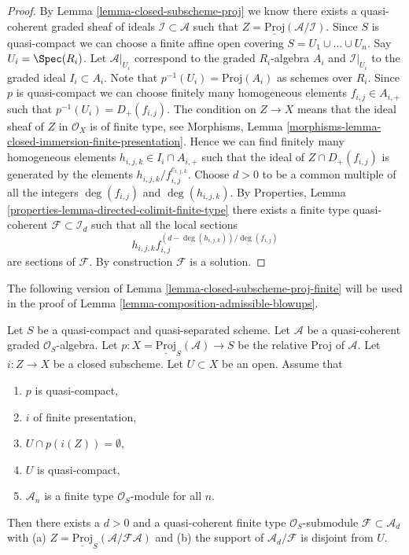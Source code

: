 \begin{proof}
By Lemma \ref{lemma-closed-subscheme-proj} we know there exists a
quasi-coherent graded sheaf of ideals $\mathcal{I} \subset \mathcal{A}$
such that $Z = \underline{\text{Proj}}(\mathcal{A}/\mathcal{I})$.
Since $S$ is quasi-compact we can choose a finite affine open covering
$S = U_1 \cup \ldots \cup U_n$. Say $U_i = \Spec(R_i)$. Let
$\mathcal{A}|_{U_i}$ correspond to the graded $R_i$-algebra $A_i$ and
$\mathcal{I}|_{U_i}$ to the graded ideal $I_i \subset A_i$. Note that
$p^{-1}(U_i) = \text{Proj}(A_i)$ as schemes over $R_i$.
Since $p$ is quasi-compact we can choose finitely many homogeneous
elements $f_{i, j} \in A_{i, +}$ such that $p^{-1}(U_i) = D_{+}(f_{i, j})$.
The condition on $Z \to X$ means that the ideal sheaf of $Z$ in
$\mathcal{O}_X$ is of finite type, see
Morphisms, Lemma \ref{morphisms-lemma-closed-immersion-finite-presentation}.
Hence we can find finitely many homogeneous elements
$h_{i, j, k} \in I_i \cap A_{i, +}$ such that the ideal of
$Z \cap D_{+}(f_{i, j})$ is generated by the elements
$h_{i, j, k}/f_{i, j}^{e_{i, j, k}}$. Choose $d > 0$ to be a common multiple
of all the integers $\deg(f_{i, j})$ and $\deg(h_{i, j, k})$.
By Properties, Lemma \ref{properties-lemma-directed-colimit-finite-type}
there exists a finite type quasi-coherent $\mathcal{F} \subset \mathcal{I}_d$
such that all the local sections
$$
h_{i, j, k}f_{i, j}^{(d - \deg(h_{i, j, k}))/\deg(f_{i, j})}
$$
are sections of $\mathcal{F}$. By construction $\mathcal{F}$ is a solution.
\end{proof}

\noindent
The following version of Lemma \ref{lemma-closed-subscheme-proj-finite}
will be used in the proof of
Lemma \ref{lemma-composition-admissible-blowups}.

\begin{lemma}
\label{lemma-closed-subscheme-proj-finite-type}
Let $S$ be a quasi-compact and quasi-separated scheme.
Let $\mathcal{A}$ be a quasi-coherent graded $\mathcal{O}_S$-algebra.
Let $p : X = \underline{\text{Proj}}_S(\mathcal{A}) \to S$ be the relative
Proj of $\mathcal{A}$. Let $i : Z \to X$ be a closed subscheme.
Let $U \subset X$ be an open. Assume that
\begin{enumerate}
\item $p$ is quasi-compact,
\item $i$ of finite presentation,
\item $U \cap p(i(Z)) = \emptyset$,
\item $U$ is quasi-compact,
\item $\mathcal{A}_n$ is a finite type $\mathcal{O}_S$-module for all $n$.
\end{enumerate}
Then there exists a $d > 0$ and a quasi-coherent finite type
$\mathcal{O}_S$-submodule $\mathcal{F} \subset \mathcal{A}_d$ with (a)
$Z = \underline{\text{Proj}}_S(\mathcal{A}/\mathcal{F}\mathcal{A})$
and (b) the support of $\mathcal{A}_d/\mathcal{F}$ is disjoint from $U$.
\end{lemma}

